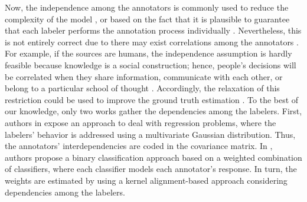 \documentclass[journal]{IEEEtran}
\begin{document}
Now, the independence among the annotators is commonly used to reduce the complexity of the model \cite{venanzi2014community}, or based on the fact that it is plausible to guarantee that each labeler performs the annotation process individually \cite{tang2019leveraging}. Nevertheless, this is not entirely correct due to there may exist correlations among the annotators \cite{zhang2011learning}. For example, if the sources are humans, the independence assumption is hardly feasible because knowledge is a social construction; hence, people's decisions will be correlated when they share information, communicate with each other, or belong to a particular school of thought \cite{surowiecki2005wisdom,hahn2018communication}. Accordingly, the relaxation of this restriction could be used to improve the ground truth estimation \cite{g2019machine}. To the best of our knowledge, only two works gather the dependencies among the labelers. First,  authors in \cite{zhu2019unsupervised} expose an approach to deal with regression problems, where the labelers' behavior is addressed using a multivariate Gaussian distribution. Thus, the annotators' interdependencies are coded in the covariance matrix.  In \cite{gil2018learning}, authors propose a binary classification approach based on a weighted combination of classifiers, where each classifier models each annotator's response. In turn,  the weights are estimated by using a kernel alignment-based approach considering dependencies among the labelers. 
\end{document}

